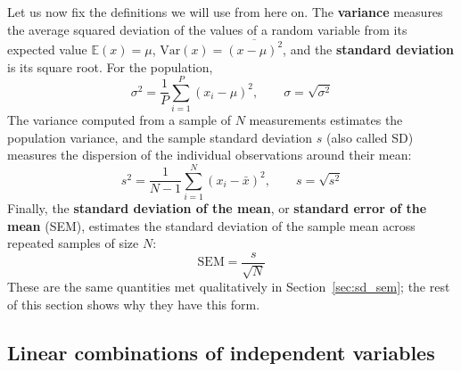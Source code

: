 \documentclass[letterpaper,11pt,leqno]{book}
\begin{document}
\label{sec:variance_definitions}

Let us now fix the definitions we will use from here on. The \textbf{variance} measures the average squared deviation of the values of a random variable from its expected value $\mathbb{E}(x) = \mu$, $\text{Var}(x) = \overline{(x - \mu)^2}$, and the \textbf{standard deviation} is its square root. For the population,
\begin{equation}
\boxed{\sigma^2 = \frac{1}{P}\sum_{i=1}^{P}(x_i - \mu)^2, \qquad \sigma = \sqrt{\sigma^2}}
\label{eq:population_variance}
\end{equation}
The variance computed from a sample of $N$ measurements estimates the population variance, and the sample standard deviation $s$ (also called SD) measures the dispersion of the individual observations around their mean:
\begin{equation}
\boxed{s^2 = \frac{1}{N - 1}\sum_{i=1}^{N}(x_i - \bar{x})^2, \qquad s = \sqrt{s^2}}
\label{eq:sample_variance}
\end{equation}
Finally, the \textbf{standard deviation of the mean}, or \textbf{standard error of the mean} (SEM), estimates the standard deviation of the sample mean across repeated samples of size $N$:
\begin{equation}
\boxed{\text{SEM} = \frac{s}{\sqrt{N}}}
\label{eq:sem_definition}
\end{equation}
These are the same quantities met qualitatively in Section~\ref{sec:sd_sem}; the rest of this section shows why they have this form.

\subsection{Linear combinations of independent variables}
\label{sec:linear_combination}
\end{document}
